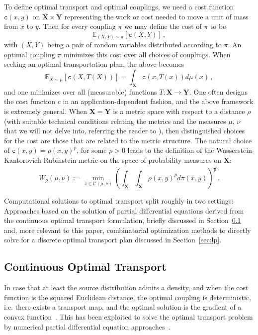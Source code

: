 \documentclass[twoside,11pt]{article}
\newcommand{\cost}[0]{\mathtt{c}}
\newcommand{\coupling}[0]{\pi}
\newcommand{\Xsp}{{\mathbf{X}}}
\newcommand{\Ysp}{{\mathbf{Y}}}
\begin{document}
To define optimal transport and optimal couplings, we need a cost function
$\cost(x,y)$ on ${\Xsp}\times{\Ysp}$ representing the work or cost needed to
move a unit of mass from $x$ to $y$. Then for every coupling $\coupling$ we may
define the cost of $\coupling$ to be 
\begin{equation}
\mathbb{E}_{(X,Y)\sim\coupling}[\cost(X,Y)]\,,
\end{equation}
with $(X,Y)$ being a pair of random variables distributed according to $\coupling$.
An optimal coupling $\coupling$ minimizes this cost over all choices of couplings.
When seeking an optimal transportation plan, the above becomes 
$$
\mathbb{E}_{X\sim\mu}[\cost(X,T(X))]=\int_{{\Xsp}} \cost(x,T(x)) d\mu(x)\,,
$$ 
and one minimizes over all (measurable) functions $T:{\Xsp}\rightarrow{\Ysp}$.
One often designs the cost function $c$ in an application-dependent fashion,
and the above framework is extremely general.  When ${\Xsp}={\Ysp}$ is a metric
space with respect to a distance $\rho$ (with suitable technical conditions
relating the metrics and the measures $\mu$, $\nu$ that we will not delve into,
referring the reader to \cite{villani:book2009}), then distinguished choices
for the cost are those that are related to the metric structure. The natural
choice of $\cost(x,y)=\rho(x,y)^p$, for some $p>0$ leads to the definition of
the Wasserstein-Kantorovich-Rubinstein metric on the space of probability
measures on ${\Xsp}$: 
\begin{equation}
W_p(\mu,\nu):=\min_{\coupling\in\mathcal{C}(\mu,\nu)}\left(\int_{{\Xsp}}\int_{{\Xsp}}
\rho(x,y)^p d\coupling(x,y)\right)^{\frac1p}\,.  
\end{equation}


Computational solutions to optimal transport split roughly in two settings:
Approaches based on the solution of partial differential equations derived from
the continuous optimal transport formulation, briefly discussed in
Section~\ref{sec:continuous} and, more relevant to this paper, combinatorial
optimization methods to directly solve for a discrete optimal transport plan
discussed in Section~\ref{sec:lp}.


\subsection{Continuous Optimal Transport}
\label{sec:continuous}
In case that at least the source distribution admits a density, and when the
cost function is the squared Euclidean distance, the optimal coupling is
deterministic, i.e. there exists a transport map, and the optimal solution is
the gradient of a convex function~\citep{brenier:cpam1991}. This has been
exploited to solve the optimal transport problem by numerical partial
differential equation
approaches~\citep{benamou:nm2000,angenent:jma2003,haker:ijcv2004,iollo:jcp2011,papadakis:arxiv2013,benamou2014numerical}.
\end{document}
